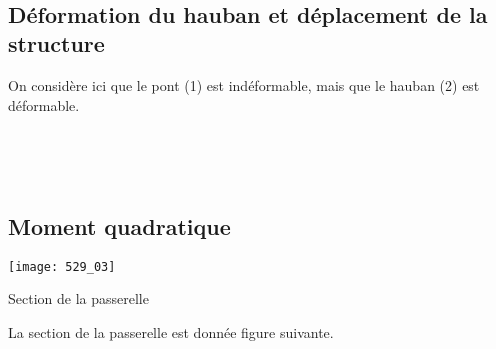 \ifprof
\begin{corrige}~\\
\end{corrige}
\else
\fi


\subsection*{Déformation du hauban et déplacement de la structure}
On considère ici que le pont (1) est indéformable, mais que le hauban (2) est déformable. 

\ifprof
\begin{corrige}~\\
\end{corrige}
\else
\fi

\ifprof
\begin{corrige}~\\
\end{corrige}
\else
\fi

\subsection*{Moment quadratique}
\begin{marginfigure}
\texttt{[image: 529\_03]}

\caption{Section de la passerelle}
\end{marginfigure}
La section de la passerelle est donnée figure suivante. 





\ifprof
\else


\fi

